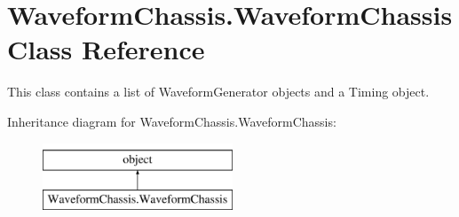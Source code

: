 \hypertarget{class_waveform_chassis_1_1_waveform_chassis}{\section{Waveform\-Chassis.\-Waveform\-Chassis Class Reference}
\label{class_waveform_chassis_1_1_waveform_chassis}
}


This class contains a list of Waveform\-Generator objects and a Timing object.  


Inheritance diagram for Waveform\-Chassis.\-Waveform\-Chassis\-:\begin{figure}[H]
\begin{center}
\leavevmode
\includegraphics[height=2.000000cm]{class_waveform_chassis_1_1_waveform_chassis}
\end{center}
\end{figure}
